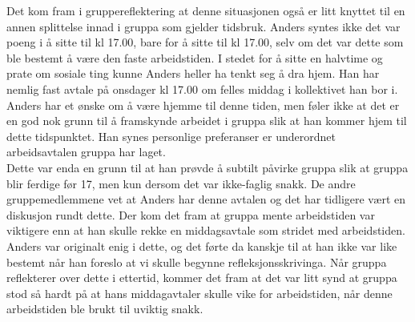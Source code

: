 Det kom fram i gruppereflektering at denne situasjonen også er litt knyttet til en annen splittelse innad i gruppa som gjelder tidsbruk. Anders syntes ikke det var poeng i å sitte til kl 17.00, bare for å sitte til kl 17.00, selv om det var dette som ble bestemt å være den faste arbeidstiden. I stedet for å sitte en halvtime og prate om sosiale ting kunne Anders heller ha tenkt seg å dra hjem. Han har nemlig fast avtale på onsdager kl 17.00 om felles middag i kollektivet han bor i. Anders har et ønske om å være hjemme til denne tiden, men føler ikke at det er en god nok grunn til å framskynde arbeidet i gruppa slik at han kommer hjem til dette tidspunktet. Han synes personlige preferanser er underordnet arbeidsavtalen gruppa har laget.\\

Dette var enda en grunn til at han prøvde å subtilt påvirke gruppa slik at gruppa blir ferdige før 17, men kun dersom det var ikke-faglig snakk. De andre gruppemedlemmene vet at Anders har denne avtalen og det har tidligere vært en diskusjon rundt dette. Der kom det fram at gruppa mente arbeidstiden var viktigere enn at han skulle rekke en middagsavtale som stridet med arbeidstiden. Anders var originalt enig i dette, og det førte da kanskje til at han ikke var like bestemt når han foreslo at vi skulle begynne refleksjonsskrivinga. Når gruppa reflekterer over dette i ettertid, kommer det fram at det var litt synd at gruppa stod så hardt på at hans middagavtaler skulle vike for arbeidstiden, når denne arbeidstiden ble brukt til uviktig snakk.
\\






